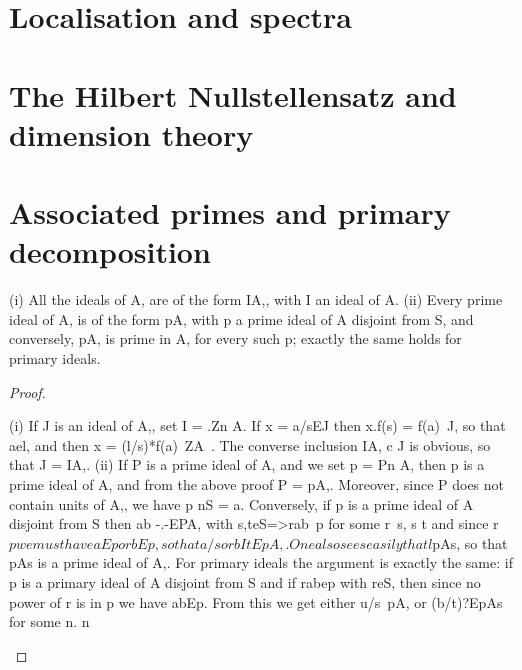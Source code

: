 
\section{Localisation and spectra}
\section{The Hilbert Nullstellensatz and dimension theory}
\section{Associated primes and primary decomposition}

\begin{theorem}[Theorem 4.1]\label{mcrt-auto-theorem-4-1}\uses{}
\begin{mathematicalrecord}
(i) All the ideals of A, are of the form IA,, with I an ideal of A.
   (ii) Every prime ideal of A, is of the form pA, with p a prime ideal of
A disjoint from S, and conversely, pA, is prime in A, for every such p;
exactly the same holds for primary ideals.
\end{mathematicalrecord}
\end{theorem}
\begin{proof}
\begin{mathematicalrecord}
(i) If J is an ideal of A,, set I = .Zn A. If x = a/sEJ then
x.f(s) = f(a)~J, so that ael, and then x = (l/s)*f(a)~ZA~. The converse
inclusion IA, c J is obvious, so that J = IA,.
   (ii) If P is a prime ideal of A, and we set p = Pn A, then p is a prime
ideal of A, and from the above proof P = pA,. Moreover, since P does
not contain units of A,, we have p nS = a. Conversely, if p is a prime
ideal of A disjoint from S then
        ab
        -.-EPA,     with   s,teS=>rab~p      for some    r~s,
        s t
and since r$p we must have aEp or bEp, so that a/s or bItEpA,. One
also sees easily that l$pAs, so that pAs is a prime ideal of A,.
   For primary ideals the argument is exactly the same: if p is a primary
ideal of A disjoint from S and if rabep with reS, then since no power
of r is in p we have abEp. From this we get either u/s~pA, or (b/t)?EpAs
for some n. n
\end{mathematicalrecord}
\end{proof}


